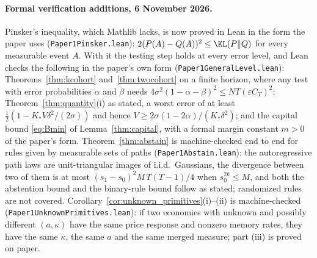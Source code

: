 \paragraph{Formal verification additions, 6 November 2026.} Pinsker's inequality, which Mathlib lacks, is now proved in Lean in the form the paper uses (\nolinkurl{Paper1Pinsker.lean}): $2(P(A)-Q(A))^2\le\KL(P\|Q)$ for every measurable event $A$. With it the testing step holds at every error level, and Lean checks the following in the paper's own form (\nolinkurl{Paper1GeneralLevel.lean}): Theorems~\ref{thm:kcohort} and~\ref{thm:twocohort} on a finite horizon, where any test with error probabilities $\alpha$ and $\beta$ needs $4\sigma^2(1-\alpha-\beta)^2\le NT(\varepsilon C_T)^2$; Theorem~\ref{thm:quantity}(i) as stated, a worst error of at least $\tfrac12(1-K_*V\delta^2/(2\sigma))$ and hence $V\ge2\sigma(1-2\alpha)/(K_*\delta^2)$; and the capital bound \eqref{eq:Bmin} of Lemma~\ref{thm:capital}, with a formal margin constant $m>0$ of the paper's form. Theorem~\ref{thm:abstain} is machine-checked end to end for rules given by measurable sets of paths (\nolinkurl{Paper1Abstain.lean}): the autoregressive path laws are unit-triangular images of i.i.d.\ Gaussians, the divergence between two of them is at most $(s_1-s_0)^2M\,T(T-1)/4$ when $s_0^{2k}\le M$, and both the abstention bound and the binary-rule bound follow as stated; randomized rules are not covered. Corollary~\ref{cor:unknown_primitives}(i)--(ii) is machine-checked (\nolinkurl{Paper1UnknownPrimitives.lean}): if two economies with unknown and possibly different $(a,\kappa)$ have the same price response and nonzero memory rates, they have the same $\kappa$, the same $a$ and the same merged measure; part (iii) is proved on paper.

